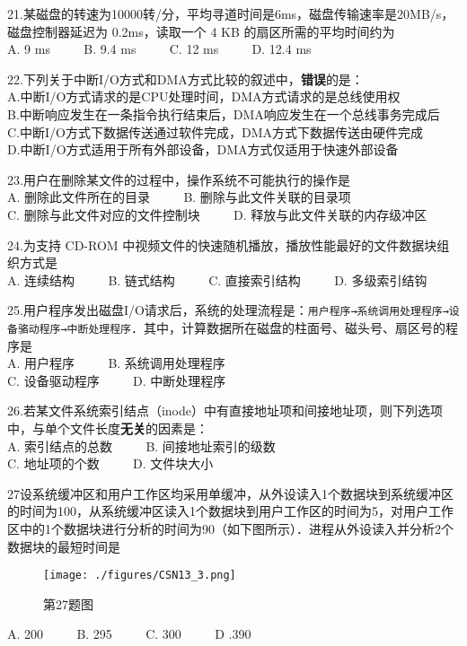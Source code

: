 21.某磁盘的转速为10000转/分，平均寻道时间是6ms，磁盘传输速率是20MB/s，磁盘控制器延迟为 0.2ms，读取一个 4 KB 的扇区所需的平均时间约为 \\
A. 9 ms $\qquad$ B. 9.4 ms $\qquad$ C. 12 ms $\qquad$ D. 12.4 ms

22.下列关于中断I/O方式和DMA方式比较的叙述中，\textbf{错误}的是： \\
A.中断I/O方式请求的是CPU处理时间，DMA方式请求的是总线使用权 \\
B.中断响应发生在一条指令执行结束后，DMA响应发生在一个总线事务完成后 \\
C.中断I/O方式下数据传送通过软件完成，DMA方式下数据传送由硬件完成 \\
D.中断I/O方式适用于所有外部设备，DMA方式仅适用于快速外部设备

23.用户在删除某文件的过程中，操作系统不可能执行的操作是 \\
A. 删除此文件所在的目录 $\qquad$ B. 删除与此文件关联的目录项 \\
C. 删除与此文件对应的文件控制块 $\qquad$ D. 释放与此文件关联的内存级冲区

24.为支持 CD-ROM 中视频文件的快速随机播放，播放性能最好的文件数据块组织方式是 \\
A. 连续结构 $\qquad$ B. 链式结构 $\qquad$ C. 直接索引结构 $\qquad$ D. 多级索引结钩

25.用户程序发出磁盘I/O请求后，系统的处理流程是：\verb|用户程序→系统调用处理程序→设备骆动程序→中断处理程序|．其中，计算数据所在磁盘的柱面号、磁头号、扇区号的程序是 \\
A. 用户程序 $\qquad$ B. 系统调用处理程序 \\
C. 设备驱动程序 $\qquad$ D. 中断处理程序

26.若某文件系统索引结点（inode）中有直接地址项和间接地址项，则下列选项中，与单个文件长度\textbf{无关}的因素是： \\
A. 索引结点的总数 $\qquad$ B. 间接地址索引的级数 \\
C. 地址项的个数 $\qquad$ D. 文件块大小

27设系统缓冲区和用户工作区均采用单缓冲，从外设读入1个数据块到系统缓冲区的时间为100，从系统缓冲区读入1个数据块到用户工作区的时间为5，对用户工作区中的1个数据块进行分析的时间为90（如下图所示）．进程从外设读入并分析2个数据块的最短时间是 \\
\begin{figure}[ht]
\centering
\texttt{[image: ./figures/CSN13\_3.png]}
\caption{第27题图} \label{CSN13_fig3}
\end{figure}
A. 200 $\qquad$ B. 295 $\qquad$ C. 300 $\qquad$ D .390

